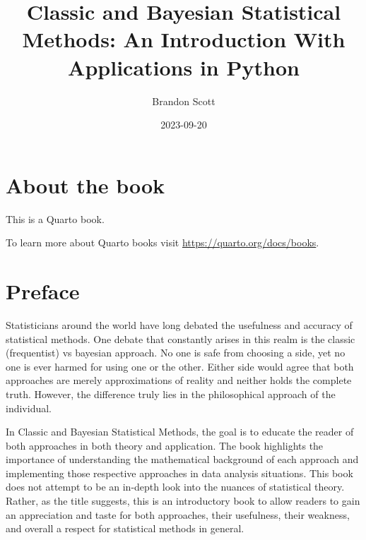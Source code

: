\documentclass[
  letterpaper,
  DIV=11,
  numbers=noendperiod]{scrreprt}
\title{Classic and Bayesian Statistical Methods: An Introduction With
Applications in Python}
\author{Brandon Scott}
\date{2023-09-20}
\renewcommand*\contentsname{Table of contents}
\newcommand\contentsname{Table of contents}
\begin{document}
\maketitle
\ifdefined\Shaded\renewenvironment{Shaded}{\begin{tcolorbox}[borderline west={3pt}{0pt}{shadecolor}, sharp corners, breakable, frame hidden, enhanced, interior hidden, boxrule=0pt]}{\end{tcolorbox}}\fi

\renewcommand*\contentsname{Table of contents}
{
\hypersetup{linkcolor=}
\setcounter{tocdepth}{2}
\tableofcontents
}

\hypertarget{about-the-book}{%
\chapter*{About the book}\label{about-the-book}}


This is a Quarto book.

To learn more about Quarto books visit
\url{https://quarto.org/docs/books}.


\hypertarget{preface}{%
\chapter*{Preface}\label{preface}}


Statisticians around the world have long debated the usefulness and
accuracy of statistical methods. One debate that constantly arises in
this realm is the classic (frequentist) vs bayesian approach. No one is
safe from choosing a side, yet no one is ever harmed for using one or
the other. Either side would agree that both approaches are merely
approximations of reality and neither holds the complete truth. However,
the difference truly lies in the philosophical approach of the
individual.

In Classic and Bayesian Statistical Methods, the goal is to educate the
reader of both approaches in both theory and application. The book
highlights the importance of understanding the mathematical background
of each approach and implementing those respective approaches in data
analysis situations. This book does not attempt to be an in-depth look
into the nuances of statistical theory. Rather, as the title suggests,
this is an introductory book to allow readers to gain an appreciation
and taste for both approaches, their usefulness, their weakness, and
overall a respect for statistical methods in general.
\end{document}
